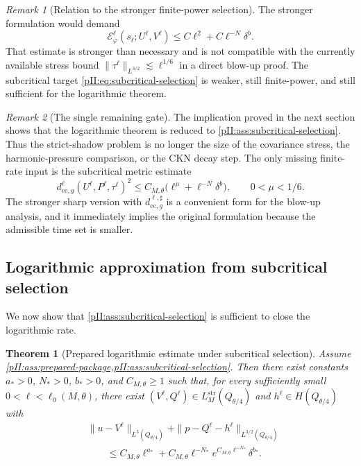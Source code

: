 \documentclass[11pt]{article}
\numberwithin{equation}{section}
\theoremstyle{plain}
\newtheorem{theorem}{Theorem}[section]
\theoremstyle{definition}
\theoremstyle{remark}
\newtheorem{remark}{Remark}[section]
\newcommand{\str}{\mathrm{str}}
\newcommand{\cc}{\mathrm{cc}}
\begin{document}
\begin{remark}[Relation to the stronger finite-power selection]
The stronger formulation would demand
\[
        \mathcal E_\varphi^\ell(s_\ell;U^\ell,V^\ell)
        \le C\ell^2+C\ell^{-N}\delta^b.
\]
That estimate is stronger than necessary and is not compatible with the currently available stress bound $\|\tau^\ell\|_{L^{3/2}}\lesssim \ell^{1/6}$ in a direct blow-up proof.  The subcritical target \eqref{pII:eq:subcritical-selection} is weaker, still finite-power, and still sufficient for the logarithmic theorem.
\end{remark}


\begin{remark}[The single remaining gate]\label{pII:rem:single-gate}
The implication proved in the next section shows that the logarithmic theorem is reduced to \cref{pII:ass:subcritical-selection}.  Thus the strict-shadow problem is no longer the size of the covariance stress, the harmonic-pressure comparison, or the CKN decay step.  The only missing finite-rate input is the subcritical metric estimate
\[
        d^\ell_{\cc,g}(U^\ell,P^\ell,\tau^\ell)^2
        \le C_{M,\theta}\bigl(\ell^\mu+\ell^{-N}\delta^b\bigr),
        \qquad 0<\mu<1/6.
\]
The stronger sharp version with $d^{\ell,\sharp}_{\cc,g}$ is a convenient form for the blow-up analysis, and it immediately implies the original formulation because the admissible time set is smaller.
\end{remark}

\subsection{Logarithmic approximation from subcritical selection}\label{pII:sec:log-rate}

We now show that \cref{pII:ass:subcritical-selection} is sufficient to close the logarithmic rate.

\begin{theorem}[Prepared logarithmic estimate under subcritical selection]\label{pII:thm:prepared-log-estimate}
Assume \cref{pII:ass:prepared-package,pII:ass:subcritical-selection}.  Then there exist constants $a_*>0$, $N_*>0$, $b_*>0$, and $C_{M,\theta}\ge1$ such that, for every sufficiently small $0<\ell<\ell_0(M,\theta)$, there exist $(V^\ell,Q^\ell)\in L_M^{\str}(Q_{\theta/4})$ and $h^\ell\in H(Q_{\theta/4})$ with
\begin{equation}\label{pII:eq:separated-prepared}
\begin{aligned}
        &\|u-V^\ell\|_{L^3(Q_{\theta/4})}
        +\|p-Q^\ell-h^\ell\|_{L^{3/2}(Q_{\theta/4})} \\
        &\qquad\le C_{M,\theta}\ell^{a_*}
        +C_{M,\theta}\ell^{-N_*}e^{C_{M,\theta}\ell^{-N_*}}\delta^{b_*}.
\end{aligned}
\end{equation}
\end{theorem}
\end{document}

